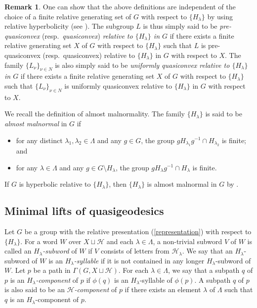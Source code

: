 \documentclass{amsart}
\theoremstyle{definition}
\newtheorem{Rem}[Thm]{Remark}
\begin{document}
\begin{Rem}\label{rem-qc}
One can show that the above definitions are independent of the choice of a finite relative generating set of $G$ with respect to $\{H_\lambda\}$ by using relative hyperbolicity (see \cite[Corollary 4.21]{M-O-Y1}). 
The subgroup $L$ is thus simply said to be {\it pre-quasiconvex} (resp.\ {\it quasiconvex}) {\it relative to $\{H_\lambda\}$ in $G$} if there exists a finite relative generating set $X$ of $G$ with respect to $\{H_\lambda\}$ such that $L$ is pre-quasiconvex (resp.\ quasiconvex) relative to $\{H_\lambda\}$ in $G$ with respect to $X$. 
The family $\{L_\nu\}_{\nu\in N}$ is also simply said to be {\it uniformly quasiconvex relative to $\{H_\lambda\}$ in $G$} if there exists a finite relative generating set $X$ of $G$ with respect to $\{H_\lambda\}$ such that $\{L_\nu\}_{\nu\in N}$ is uniformly quasiconvex relative to $\{H_\lambda\}$ in $G$ with respect to $X$. 
\end{Rem}

We recall the definition of almost malnormality. 
The family $\{H_\lambda\}$ is said to be {\it almost malnormal} in $G$ if 
\begin{itemize}
\item for any distinct $\lambda_1,\lambda_2\in\Lambda$ and any $g\in G$, the group $gH_{\lambda_1}g^{-1}\cap H_{\lambda_2}$ is finite; and
\item for any $\lambda\in\Lambda$ and any $g\in G\setminus H_\lambda$, the group $gH_\lambda g^{-1}\cap H_\lambda$ is finite. 
\end{itemize}
If $G$ is hyperbolic relative to $\{H_\lambda\}$, then $\{H_\lambda\}$ is almost malnormal in $G$ by \cite[Proposition 2.36]{Osi06}. 

\subsection{Minimal lifts of quasigeodesics}

Let $G$ be a group with the relative presentation (\ref{representation}) with respect to $\{H_\lambda\}$. 
For a word $W$ over $X\sqcup \mathcal{H}$ and each $\lambda\in\Lambda$, a non-trivial subword $V$ of $W$ is called an {\it $H_\lambda$-subword} of $W$ if $V$ consists of letters from ${\mathcal H}_\lambda$. 
We say that an $H_\lambda$-subword of $W$ is an {\it $H_\lambda$-syllable} if it is not contained in any longer $H_\lambda$-subword of $W$. 
Let $p$ be a path in $\Gamma(G,X\sqcup {\mathcal H})$. 
For each $\lambda\in\Lambda$, we say that a subpath $q$ of $p$ is an {\it $H_\lambda$-component} of $p$ if $\phi(q)$ is an $H_\lambda$-syllable of $\phi(p)$.  
A subpath $q$ of $p$ is also said to be an {\it ${\mathcal H}$-component} of $p$ if there exists an element $\lambda$ of $\Lambda$ such that $q$ is an $H_\lambda$-component of $p$. 
\end{document}
